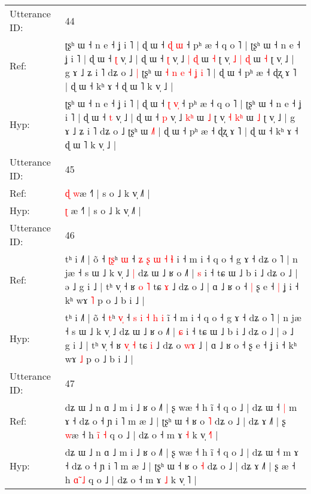 \documentclass[10pt]{article}
\DeclareRobustCommand{\hl}[1]{{\textcolor{red}{#1}}}
\begin{document}
\begin{longtable}{ll}
 \\
\midrule
Utterance ID: & 44 \\
Ref: & ʈʂʰ ɯ ˧ n e ˧ ʝ i ˥ | ɖ ɯ ˧ \hl{ɖ} \hl{}\hl{ɯ} ˧ pʰ æ ˧ q o ˥ | ʈʂʰ ɯ ˧ n e ˧ ʝ i ˥ | ɖ ɯ ˧ \hl{ʈ} v̩ ˩ | ɖ ɯ ˧ \hl{ʈ} v̩ ˩ \hl{|}\hl{ }\hl{ɖ} ɯ \hl{˧} ʈ v̩ \hl{˩} \hl{|}\hl{ }\hl{ɖ} ɯ \hl{˧} ʈ v̩ ˩ | g ɤ ˩ ʑ i ˥ dʑ o ˩\hl{ }\hl{|} ʈʂʰ ɯ\hl{ }\hl{˧}\hl{ }\hl{n}\hl{ }\hl{e}\hl{ }\hl{˧}\hl{ }\hl{ʝ} \hl{i}\hl{ }˥ | ɖ ɯ ˧ pʰ æ ˧ ɖʐ ɤ ˥ | ɖ ɯ ˧ kʰ ɤ ˧ ɖ ɯ ˥ k v̩ ˩ |
 \\
Hyp: & ʈʂʰ ɯ ˧ n e ˧ ʝ i ˥ | ɖ ɯ ˧ \hl{ʈ} \hl{v}\hl{̩} ˧ pʰ æ ˧ q o ˥ | ʈʂʰ ɯ ˧ n e ˧ ʝ i ˥ | ɖ ɯ ˧ \hl{t} v̩ ˩ | ɖ ɯ ˧ \hl{p} v̩ ˩ \hl{}\hl{k}\hl{ʰ} ɯ \hl{˩} ʈ v̩ \hl{˧} \hl{}\hl{k}\hl{ʰ} ɯ \hl{˩} ʈ v̩ ˩ | g ɤ ˩ ʑ i ˥ dʑ o ˩\hl{}\hl{} ʈʂʰ ɯ\hl{}\hl{}\hl{}\hl{}\hl{}\hl{}\hl{}\hl{}\hl{}\hl{} \hl{}\hl{˩}˥ | ɖ ɯ ˧ pʰ æ ˧ ɖʐ ɤ ˥ | ɖ ɯ ˧ kʰ ɤ ˧ ɖ ɯ ˥ k v̩ ˩ |
 \\
\midrule
Utterance ID: & 45 \\
Ref: & \hl{ɖ} \hl{w}æ ˧˥ | s o ˩ k v̩ ˩˥ |
 \\
Hyp: & \hl{ʈ} \hl{}æ ˧˥ | s o ˩ k v̩ ˩˥ |
 \\
\midrule
Utterance ID: & 46 \\
Ref: & tʰ i ˩˥ | õ ˧ \hl{ʈ}\hl{ʂ}ʰ \hl{}\hl{ɯ} ˧ \hl{ʑ} \hl{ʂ} \hl{ɯ} \hl{˧} \hl{ɬ} i\hl{} ˧ m i ˧ q o ˧ g ɤ ˧ dʑ o ˥ | n jæ ˧ s ɯ ˩ k v̩ ˩\hl{ }\hl{|} dʑ ɯ ˩ ʁ o ˩˥ | \hl{s} i ˧ tɕ ɯ ˩ b i ˩ dʑ o ˩ | ə ˩ g i ˩ | tʰ v̩ ˧ ʁ \hl{}\hl{o} \hl{˥} tɕ \hl{ɤ} ˩ dʑ o\hl{}\hl{}\hl{} ˩ | ɑ ˩ ʁ o ˧\hl{ }\hl{|} ʂ e ˧\hl{ }\hl{|} ʝ i ˧ kʰ wɤ \hl{˥} p o ˩ b i ˩ |
 \\
Hyp: & tʰ i ˩˥ | õ ˧ \hl{}\hl{t}ʰ \hl{v}\hl{̩} ˧ \hl{s} \hl{i} \hl{˧} \hl{h} \hl{i} i\hl{̃} ˧ m i ˧ q o ˧ g ɤ ˧ dʑ o ˥ | n jæ ˧ s ɯ ˩ k v̩ ˩\hl{}\hl{} dʑ ɯ ˩ ʁ o ˩˥ | \hl{ɕ} i ˧ tɕ ɯ ˩ b i ˩ dʑ o ˩ | ə ˩ g i ˩ | tʰ v̩ ˧ ʁ \hl{v}\hl{̩} \hl{˧} tɕ \hl{i} ˩ dʑ o\hl{ }\hl{w}\hl{ɤ} ˩ | ɑ ˩ ʁ o ˧\hl{}\hl{} ʂ e ˧\hl{}\hl{} ʝ i ˧ kʰ wɤ \hl{˩} p o ˩ b i ˩ |
 \\
\midrule
Utterance ID: & 47 \\
Ref: & dʑ ɯ ˩ n ɑ ˩ m i ˩ ʁ o ˩˥ | ʂ wæ ˧ h ĩ ˧ q o ˩ | dʑ ɯ ˧\hl{ }\hl{|} m ɤ ˧ dʑ o ˧ ɲ i ˥ m æ ˩ | ʈʂʰ ɯ ˧ ʁ o \hl{˥} dʑ o ˩ | dʑ ɤ ˩˥ | ʂ \hl{w}æ ˧ h \hl{i}̃ \hl{˧} q o ˩ | dʑ o ˧ m ɤ \hl{˧} k v̩ \hl{˧}˥ |
 \\
Hyp: & dʑ ɯ ˩ n ɑ ˩ m i ˩ ʁ o ˩˥ | ʂ wæ ˧ h ĩ ˧ q o ˩ | dʑ ɯ ˧\hl{}\hl{} m ɤ ˧ dʑ o ˧ ɲ i ˥ m æ ˩ | ʈʂʰ ɯ ˧ ʁ o \hl{˧} dʑ o ˩ | dʑ ɤ ˩˥ | ʂ \hl{}æ ˧ h \hl{ɑ}̃ \hl{˩} q o ˩ | dʑ o ˧ m ɤ \hl{˩} k v̩ \hl{}˥ |
 \\

\end{longtable}
\end{document}
